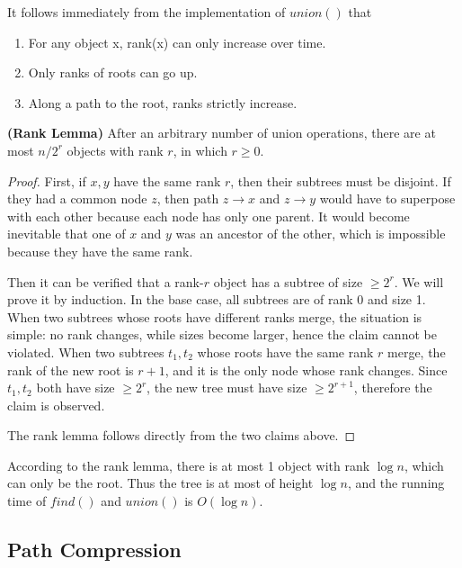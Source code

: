 It follows immediately from the implementation of $union()$ that
\begin{enumerate}
\item For any object x, rank(x) can only increase over time.
\item Only ranks of roots can go up.
\item Along a path to the root, ranks strictly increase.
\end{enumerate}
\begin{lemma}\textbf{(Rank Lemma)}
After an arbitrary number of union operations, there are at most $n/2^r$ objects with rank $r$, in which $r\geq 0$. 
\end{lemma}
\begin{proof}
First, if $x,y$ have the same rank $r$, then their subtrees must be disjoint. If they had a common node $z$, then path $z\rightarrow x$ and $z\rightarrow y$ would have to superpose with each other because each node has only one parent. It would become inevitable that one of $x$ and $y$ was an ancestor of the other, which is impossible because they have the same rank. 

Then it can be verified that a rank-$r$ object has a subtree of size $\geq 2^r$. We will prove it by induction. In the base case, all subtrees are of rank $0$ and size 1. When two subtrees whose roots have different ranks merge, the situation is simple: no rank changes, while sizes become larger, hence the claim cannot be violated. When two subtrees $t_1, t_2$ whose roots have the same rank $r$ merge, the rank of the new root is $r+1$, and it is the only node whose rank changes. Since $t_1,t_2$ both have size $\geq 2^r$, the new tree must have size $\geq 2^{r+1}$, therefore the claim is observed. 

The rank lemma follows directly from the two claims above.    
\end{proof}
According to the rank lemma, there is at most 1 object with rank $\log n$, which can only be the root. Thus the tree is at most of height $\log n$, and the running time of $find()$ and $union()$ is $O(\log n)$. 
\subsection{Path Compression}
\begin{algorithmic}[1]
\EndWhile
{}
\EndWhile
{}
\EndFunction
\end{algorithmic}
\ifx\PREAMBLE\undefined

\fi